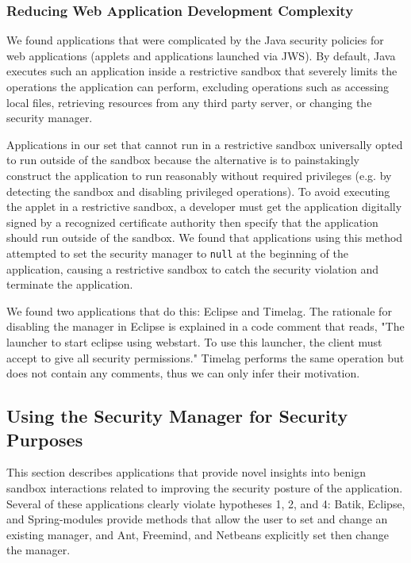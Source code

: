 \documentclass{sig-alternate}
\begin{document}
\subsubsection{Reducing Web Application Development Complexity}\label{sub:Reducing-Web-Application-Complexity}

We found applications that were complicated by the Java security policies
for web applications (applets and applications launched via JWS). By default, Java executes such an application inside a restrictive
sandbox that severely limits the operations the application can perform,
excluding operations such as accessing local files, retrieving resources
from any third party server, or changing the security manager. 

Applications in our set that cannot run in a restrictive sandbox universally opted to run outside of the sandbox because the alternative is to painstakingly construct the application to run reasonably without required privileges (e.g. by detecting the sandbox and disabling privileged operations). To avoid executing the applet in a restrictive
sandbox, a developer must get the application digitally signed
by a recognized certificate authority then specify that the application should
run outside of the sandbox. We found that applications using this method attempted
to set the security manager to \texttt{null} at the beginning of the
application, causing a restrictive sandbox to catch the security violation and
terminate the application.

We found two applications that do this: Eclipse and
Timelag. The rationale for disabling the manager in Eclipse is explained in a code comment that reads, "The launcher to start eclipse using webstart. To use this launcher, the client must accept to give all security permissions." Timelag performs the same operation but does not contain any comments, thus we can only infer their motivation.

\subsection{Using the Security Manager for Security Purposes}\label{sub:Using-the-Security}

This section describes applications that provide novel insights into benign sandbox interactions related to improving the security
posture of the application. Several of these applications clearly violate hypotheses 1, 2, and 4: Batik, Eclipse, and Spring-modules provide
methods that allow the user to set and change an existing manager,
and Ant, Freemind, and Netbeans explicitly set then change the manager.
\end{document}
